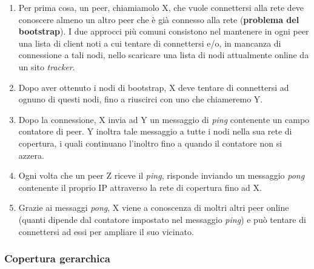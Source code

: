 \begin{enumerate}
\def\labelenumi{\arabic{enumi}.}
\item
  Per prima cosa, un peer, chiamiamolo X, che vuole connettersi alla   rete deve conoscere almeno un altro peer che è già connesso alla rete   (\textbf{problema del bootstrap}). I due approcci più comuni   consistono nel mantenere in ogni peer una lista di client noti a cui   tentare di connettersi e/o, in mancanza di connessione a tali nodi,   nello scaricare una lista di nodi attualmente online da un sito
  \emph{tracker}.
\item
  Dopo aver ottenuto i nodi di bootstrap, X deve tentare di connettersi   ad ognuno di questi nodi, fino a riuscirci con uno che chiameremo Y.
\item
  Dopo la connessione, X invia ad Y un messaggio di \emph{ping}   contenente un campo contatore di peer. Y inoltra tale messaggio a   tutte i nodi nella sua rete di copertura, i quali continuano l'inoltro   fino a quando il contatore non si azzera.
\item
  Ogni volta che un peer Z riceve il \emph{ping}, risponde inviando un   messaggio \emph{pong} contenente il proprio IP attraverso la rete di   copertura fino ad X.
\item
  Grazie ai messaggi \emph{pong}, X viene a conoscenza di moltri altri   peer online (quanti dipende dal contatore impostato nel messaggio   \emph{ping}) e può tentare di connettersi ad essi per ampliare il suo   vicinato.
\end{enumerate}

\subsubsection{Copertura gerarchica}\label{copertura-gerarchica}

